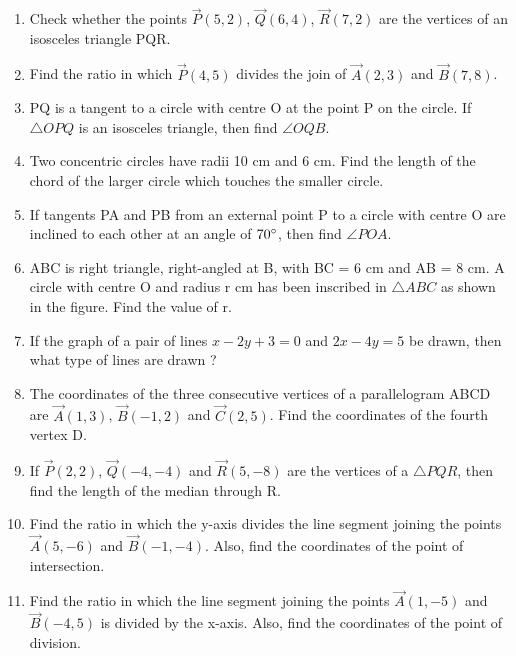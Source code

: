 \documentclass{article}
\begin{document}
\begin{enumerate}
        \item Check whether the points $\vec{P}(5, 2)$, $\vec{Q}(6, 4)$, $\vec{R}(7, 2)$ are the vertices of an isosceles triangle PQR.

        \item Find the ratio in which $\vec{P}(4, 5)$ divides the join of $\vec{A}(2, 3)$ and $\vec{B}(7, 8)$. 
	
		\item PQ is a tangent to a circle with centre O at the point P on the circle. If $\triangle OPQ$ is an isosceles triangle, then find $\angle OQB$. 

		\item Two concentric circles have radii 10 cm and 6 cm. Find the length of the chord of the larger circle which touches the smaller circle. 

		\item If tangents PA and PB from an external point P to a circle with centre O are inclined to each other at an angle of $70\degree$, then find $\angle POA$. 

		\item ABC is right triangle, right-angled at B, with BC = 6 cm and AB = 8 cm. A circle with centre O and radius r cm has been inscribed in $\triangle ABC$ as shown in the figure. Find the value of r. 

		\item If the graph of a pair of lines $x - 2y + 3 = 0$ and $2x - 4y = 5$ be drawn, then what type of lines are drawn ? 
  
		\item The coordinates of the three consecutive vertices of a parallelogram ABCD are $\vec{A}(1, 3)$, $\vec{B}(-1, 2)$ and $\vec{C}(2, 5)$. Find the coordinates of the fourth vertex D. 

		\item If $\vec{P}(2, 2)$, $\vec{Q}(-4, -4)$ and $\vec{R}(5, -8)$ are the vertices of a  $\triangle PQR$, then find the length of the median through R.

        \item Find the ratio in which the y-axis divides the line segment joining the points $\vec{A}(5, -6)$ and $\vec{B}(-1, -4)$. Also, find the coordinates of the point of intersection.

        \item Find the ratio in which the line segment joining the points $\vec{A}(1, -5)$ and $\vec{B}(-4, 5)$ is divided by the x-axis. Also, find the coordinates of the point of division.
   

\end{enumerate}
\end{document}
